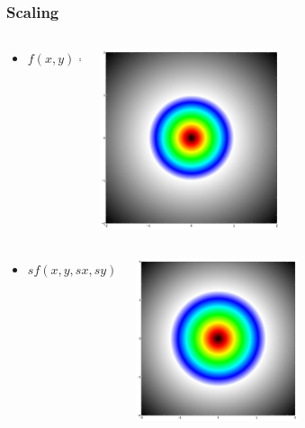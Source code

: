 \documentclass{beamer}
\begin{document}
\begin{frame}
\frametitle{Scaling}
\begin{columns}
  \begin{column}{0.5\textwidth}
    \begin{itemize}
    \item $f(x,y)=sqrt(x^2+y^2)-1$
    \end{itemize}
  \end{column}
  \begin{column}{0.5\textwidth}
    \includegraphics[width=0.5\textwidth, right]{implicit_circle.jpg}
  \end{column}
\end{columns}
\begin{columns}
  \begin{column}{0.5\textwidth}
    \begin{itemize}
    \item $sf(x,y,sx,sy)=sqrt((x/sx)^2+(y/sy)^2)-1$
    \end{itemize}
  \end{column}
  \begin{column}{0.5\textwidth}
    \includegraphics[width=0.5\textwidth, right]{implicit_scaled_circle.jpg}
  \end{column}
\end{columns}
\end{frame}
\end{document}
